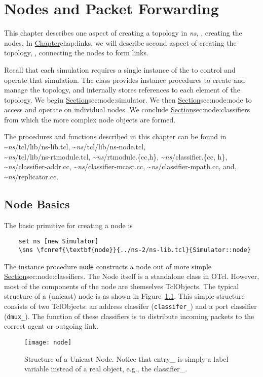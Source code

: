 \chapter{Nodes and Packet Forwarding}
\label{chap:nodes}

This chapter describes one aspect of creating a topology in \emph{ns},
\ie, creating the nodes.
In 
\href{the next chapter}{Chapter}{chap:links},
we will describe second aspect of creating the topology,
\ie, connecting the nodes to form links.

Recall that each simulation requires a single instance of the
 to control and operate
that simulation. 
The class provides instance procedures to create and manage the topology,
and internally stores references to each element of the topology.
We begin 
\href{by describing the procedures in the class Simulator}{%
        Section}{sec:node:simulator}.
We then
\href{describe the instance procedures in the class Node}{%
        Section}{sec:node:node}
to access and operate on individual nodes.
We conclude
\href{with detailed descriptions of the Classifier}{%
        Section}{sec:node:classifiers}
from which the more complex node objects are formed.

The procedures and functions described in this chapter can be found in
\textasciitilde\emph{ns}/{tcl/lib/ns-lib.tcl}, \textasciitilde\emph{ns}/{tcl/lib/ns-node.tcl}, \\
\textasciitilde\emph{ns}/{tcl/lib/ns-rtmodule.tcl}, \textasciitilde\emph{ns}/{rtmodule.\{cc,h\}}, 
\textasciitilde\emph{ns}/{classifier.\{cc, h\}}, \textasciitilde\emph{ns}/{classifier-addr.cc},
\textasciitilde\emph{ns}/{classifier-mcast.cc}, \textasciitilde\emph{ns}/{classifier-mpath.cc}, 
and, \textasciitilde\emph{ns}/{replicator.cc}.

\section{Node Basics}
\label{sec:node:simulator}

The basic primitive for creating a node is
\begin{verbatim}
    set ns [new Simulator]
    \$ns \fcnref{\textbf{node}}{../ns-2/ns-lib.tcl}{Simulator::node}
\end{verbatim} %
The instance procedure {\tt node} constructs
a node out of more simple
\href{classifier objects}{Section}{sec:node:classifiers}.
The Node itself is a standalone class in OTcl.
However, most of the components of the node are themselves TclObjects.
The typical structure of a (unicast) 
node is as shown in Figure~\ref{fig:node:unicast}.  This simple structure
consists of two TclObjects:  an address classifer ({\tt classifer\_}) and
a port classifier ({\tt dmux\_}).  The function of these classifiers
is to distribute incoming packets to the correct agent or outgoing link.
\begin{figure}[tb]
  \centerline{\texttt{[image: node]}}
  \caption{Structure of a Unicast Node.  Notice that entry\_ is simply a 
   label variable instead of a real object, e.g., the classifier\_.}
  \label{fig:node:unicast}
\end{figure}

